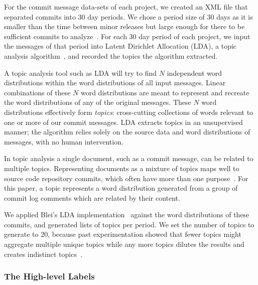\documentclass[smallextended]{svjour3}       %
\begin{document}
For the commit message data-sets of each project, we created an XML file that separated commits into 30 day periods. 
We chose a period size of 30 days as it is smaller than the time between minor releases but large enough for there to be sufficient commits to
analyze~\cite{Hindle09ICSM}. 
For each 30 day period of each project, we input the messages of that period into Latent Dirichlet Allocation (LDA), a topic analysis
algorithm~\cite{Blei2003}, and recorded the topics the algorithm extracted.

A topic analysis tool such as LDA will try to find $N$ independent
word distributions within the word distributions of all input messages. 
Linear combinations of these $N$ word distributions are meant to represent and recreate the word distributions of any of the original messages. 
These $N$ word distributions effectively form \emph{topics}: cross-cutting collections of words relevant to one or more of our commit messages. 
LDA extracts topics in an unsupervised manner; the algorithm relies
solely on the source data and word distributions of messages, with no human intervention.

In topic analysis a single document, such as a commit message, can be related to multiple topics. 
Representing documents as a mixture of topics maps well to source code repository commits, which often have more than one purpose~\cite{Hindle09ICSM}.  
For this paper, a topic represents a word distribution generated from a group of commit log comments which are related by their content.  

We applied Blei's LDA implementation~\cite{Blei2003} against the word distributions of these commits, and generated lists of topics per period. 
We set the number of topics to generate to $20$, because past experimentation showed that fewer topics might aggregate multiple unique topics while
any more topics dilutes the results and creates indistinct topics~\cite{Hindle09ICSM}. 

\subsubsection{The High-level Labels}
\end{document}
